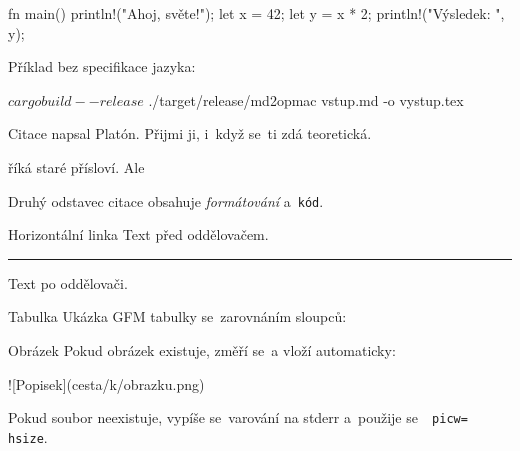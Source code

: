 \begtt
fn main() {
    println!("Ahoj, světe!");
    let x = 42;
    let y = x * 2;
    println!("Výsledek: {}", y);
}
\endtt

Příklad bez specifikace jazyka:

\begtt
$ cargo build --release
$ ./target/release/md2opmac vstup.md -o vystup.tex
\endtt


\sec Citace
\begcitation
{} napsal Platón.
Přijmi ji, i~když se~ti zdá teoretická.

\endcitation

\begcitation
{} říká staré přísloví.
Ale 

\endcitation

\begcitation
Druhý odstavec citace obsahuje {\it formátování} a~{\tt kód}.

\endcitation


\sec Horizontální linka
Text před oddělovačem.

\noindent\hrule

Text po oddělovači.


\sec Tabulka
Ukázka GFM tabulky se~zarovnáním sloupců:



\sec Obrázek
Pokud obrázek existuje, změří se~a vloží automaticky:

\begtt
![Popisek](cesta/k/obrazku.png)
\endtt

Pokud soubor neexistuje, vypíše se~varování na stderr a~použije se~{\tt {} picw= hsize}.


\bye

